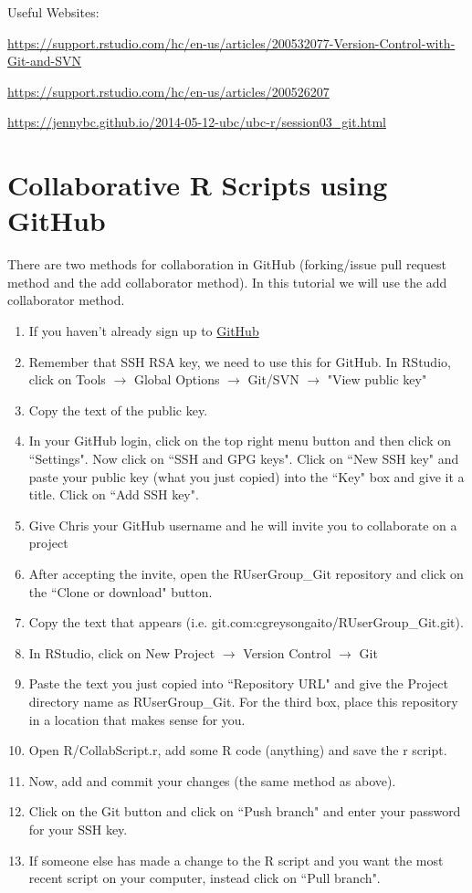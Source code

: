 \documentclass[12pt,letterpaper]{article} %
\begin{document}
Useful Websites:

\url{https://support.rstudio.com/hc/en-us/articles/200532077-Version-Control-with-Git-and-SVN}

\url{https://support.rstudio.com/hc/en-us/articles/200526207}

\url{https://jennybc.github.io/2014-05-12-ubc/ubc-r/session03_git.html}



\section*{Collaborative R Scripts using GitHub}
There are two methods for collaboration in GitHub (forking/issue pull request method and the add collaborator method). In this tutorial we will use the add collaborator method.

\begin{enumerate}
\item If you haven't already sign up to \href{https://github.com/join?source=header-home}{GitHub}
\item Remember that SSH RSA key, we need to use this for GitHub. In RStudio, click on Tools $\rightarrow$ Global Options $\rightarrow$ Git/SVN $\rightarrow$ "View public key"
\item Copy the text of the public key.
\item In your GitHub login, click on the top right menu button and then click on ``Settings". Now click on ``SSH and GPG keys". Click on ``New SSH key" and paste your public key (what you just copied) into the ``Key" box and give it a title. Click on ``Add SSH key".
\item Give Chris your GitHub username and he will invite you to collaborate on a project
\item After accepting the invite, open the RUserGroup\_Git repository and click on the ``Clone or download" button.
\item Copy the text that appears (i.e. git\@github.com:cgreysongaito/RUserGroup\_Git.git).
\item In RStudio, click on New Project $\rightarrow$ Version Control $\rightarrow$ Git
\item Paste the text you just copied into ``Repository URL" and give the Project directory name as RUserGroup\_Git. For the third box, place this repository in a location that makes sense for you.
\item Open R/CollabScript.r, add some R code (anything) and save the r script.
\item Now, add and commit your changes (the same method as above).
\item Click on the Git button and click on ``Push branch" and enter your password for your SSH key.
\item If someone else has made a change to the R script and you want the most recent script on your computer, instead click on ``Pull branch".
\end{enumerate}
\end{document}
